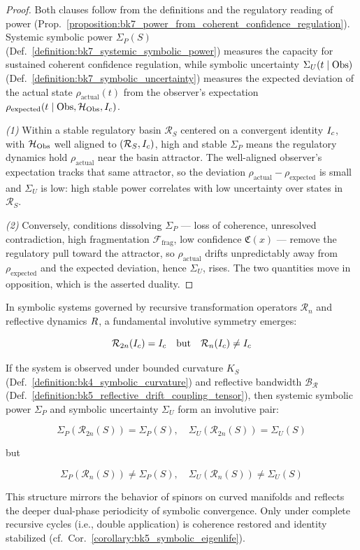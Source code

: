 \begin{proof}
\label{proof:bk7_power_uncertainty_duality}
\leavevmode
Both clauses follow from the definitions and the regulatory reading of power (Prop.~\ref{proposition:bk7_power_from_coherent_confidence_regulation}). Systemic symbolic power $\Sigma_P(S)$ (Def.~\ref{definition:bk7_systemic_symbolic_power}) measures the capacity for sustained coherent confidence regulation, while symbolic uncertainty $\Sigma_U(t\mid\mathrm{Obs})$ (Def.~\ref{definition:bk7_symbolic_uncertainty}) measures the expected deviation of the actual state $\rho_{\text{actual}}(t)$ from the observer's expectation $\rho_{\text{expected}}(t\mid\mathrm{Obs},\mathcal{H}_{\mathrm{Obs}},I_c)$.

\emph{(1)} Within a stable regulatory basin $\mathcal{R}_S$ centered on a convergent identity $I_c$, with $\mathcal{H}_{\mathrm{Obs}}$ well aligned to $(\mathcal{R}_S,I_c)$, high and stable $\Sigma_P$ means the regulatory dynamics hold $\rho_{\text{actual}}$ near the basin attractor. The well-aligned observer's expectation tracks that same attractor, so the deviation $\rho_{\text{actual}}-\rho_{\text{expected}}$ is small and $\Sigma_U$ is low: high stable power correlates with low uncertainty over states in $\mathcal{R}_S$.

\emph{(2)} Conversely, conditions dissolving $\Sigma_P$ --- loss of coherence, unresolved contradiction, high fragmentation $\mathcal{F}_{\text{frag}}$, low confidence $\mathfrak{C}(x)$ --- remove the regulatory pull toward the attractor, so $\rho_{\text{actual}}$ drifts unpredictably away from $\rho_{\text{expected}}$ and the expected deviation, hence $\Sigma_U$, rises. The two quantities move in opposition, which is the asserted duality.
\end{proof}
\begin{lemma}
\label{lemma:bk7_involutive_dual_symmetry}
In symbolic systems governed by recursive transformation operators \(\mathcal{R}_n\) and reflective dynamics \(R\), a fundamental involutive symmetry emerges:

\[
\mathcal{R}_{2n}(I_c) = I_c \quad \text{but} \quad \mathcal{R}_n(I_c) \neq I_c
\]

If the system is observed under bounded curvature \(K_S\) (Def.~\ref{definition:bk4_symbolic_curvature}) and reflective bandwidth \(\mathcal{B_R}\) (Def.~\ref{definition:bk5_reflective_drift_coupling_tensor}), then systemic symbolic power \(\Sigma_P\) and symbolic uncertainty \(\Sigma_U\) form an involutive pair:

\[
\Sigma_P(\mathcal{R}_{2n}(S)) = \Sigma_P(S), \quad \Sigma_U(\mathcal{R}_{2n}(S)) = \Sigma_U(S)
\]

but

\[
\Sigma_P(\mathcal{R}_{n}(S)) \ne \Sigma_P(S), \quad \Sigma_U(\mathcal{R}_{n}(S)) \ne \Sigma_U(S)
\]

This structure mirrors the behavior of spinors on curved manifolds and reflects the deeper dual-phase periodicity of symbolic convergence. Only under complete recursive cycles (i.e., double application) is coherence restored and identity stabilized (cf.~Cor.~\ref{corollary:bk5_symbolic_eigenlife}).

\end{lemma}
